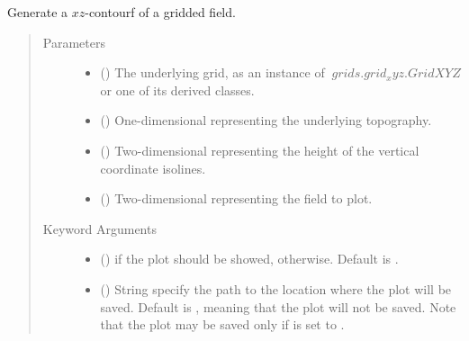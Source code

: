 \documentclass[letterpaper,10pt,english]{sphinxmanual}
\begin{document}

\begin{fulllineitems}
\label{\detokenize{api:utils.utils_plot.contourf_xz}}
Generate a \(xz\)-contourf of a gridded field.
\begin{quote}\begin{description}
\item[{Parameters}] \leavevmode\begin{itemize}
\item {} 
 () \textendash{} The underlying grid, as an instance of \(~grids.grid_xyz.GridXYZ\) or one of its derived classes.

\item {} 
 () \textendash{} One-dimensional  representing the underlying topography.

\item {} 
 () \textendash{} Two-dimensional  representing the height of the vertical coordinate isolines.

\item {} 
 () \textendash{} Two-dimensional  representing the field to plot.

\end{itemize}

\item[{Keyword Arguments}] \leavevmode\begin{itemize}
\item {} 
 () \textendash{}  if the plot should be showed,  otherwise. Default is .

\item {} 
 () \textendash{} String specify the path to the location where the plot will be saved. Default is , meaning that the plot
will not be saved. Note that the plot may be saved only if  is set to .


\end{itemize}
\end{description}
\end{quote}
\end{fulllineitems}
\end{document}
